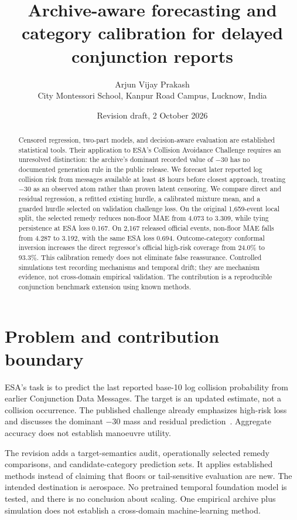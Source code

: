 \documentclass[10pt]{article}
\title{Archive-aware forecasting and category calibration for delayed conjunction reports}
\author{Arjun Vijay Prakash\\City Montessori School, Kanpur Road Campus, Lucknow, India}
\date{Revision draft, 2 October 2026}
\newcommand{\LocalPersistNonfloor}{4.073}
\newcommand{\LocalRemedyNonfloor}{3.309}
\newcommand{\LocalRemedyLoss}{0.167}
\newcommand{\OfficialPersistNonfloor}{4.287}
\newcommand{\OfficialRemedyNonfloor}{3.192}
\newcommand{\OfficialRemedyLoss}{0.694}
\newcommand{\OfficialTailMarginal}{24.0}
\newcommand{\OfficialTailMondrian}{93.3}
\begin{document}
\maketitle
\begin{abstract}
Censored regression, two-part models, and decision-aware evaluation are established statistical tools. Their application to ESA's Collision Avoidance Challenge requires an unresolved distinction: the archive's dominant recorded value of $-30$ has no documented generation rule in the public release. We forecast later reported log collision risk from messages available at least 48 hours before closest approach, treating $-30$ as an observed atom rather than proven latent censoring. We compare direct and residual regression, a refitted existing hurdle, a calibrated mixture mean, and a guarded hurdle selected on validation challenge loss. On the original 1,659-event local split, the selected remedy reduces non-floor MAE from \LocalPersistNonfloor{} to \LocalRemedyNonfloor{}, while tying persistence at ESA loss \LocalRemedyLoss{}. On 2,167 released official events, non-floor MAE falls from \OfficialPersistNonfloor{} to \OfficialRemedyNonfloor{}, with the same ESA loss \OfficialRemedyLoss{}. Outcome-category conformal inversion increases the direct regressor's official high-risk coverage from \OfficialTailMarginal{}\% to \OfficialTailMondrian{}\%. This calibration remedy does not eliminate false reassurance. Controlled simulations test recording mechanisms and temporal drift; they are mechanism evidence, not cross-domain empirical validation. The contribution is a reproducible conjunction benchmark extension using known methods.
\end{abstract}

\section{Problem and contribution boundary}
ESA's task is to predict the last reported base-10 log collision probability from earlier Conjunction Data Messages. The target is an updated estimate, not a collision occurrence. The published challenge already emphasizes high-risk loss and discusses the dominant $-30$ mass and residual prediction~\cite{uriot}. Aggregate accuracy does not establish manoeuvre utility.

The revision adds a target-semantics audit, operationally selected remedy comparisons, and candidate-category prediction sets. It applies established methods instead of claiming that floors or tail-sensitive evaluation are new. The intended destination is aerospace. No pretrained temporal foundation model is tested, and there is no conclusion about scaling. One empirical archive plus simulation does not establish a cross-domain machine-learning method.
\end{document}
